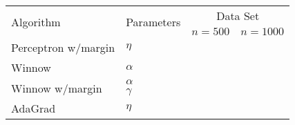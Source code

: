 
\usepackage{amsmath,amssymb,url,color,multirow,array}
\sloppy
\newcommand{\ignore}[1]{}

\oddsidemargin 0in
\evensidemargin 0in
\textwidth 6.5in
\topmargin -0.5in
\textheight 9.0in



\begin{center}
  \begin{table}[!hbp]
    \begin{tabular}{|p{4.3cm}<{\centering}|p{2.5cm}<{\centering}|p{4cm}<{\centering}|p{4cm}<{\centering}|}
      \hline
      \multirow{2}{*}{Algorithm} & \multirow{2}{*}{Parameters} & \multicolumn{2}{|c|}{Data Set} \\
      \cline{3-4}
 & & $n=500$& $n=1000$\\
 \hline
      Perceptron w/margin &          $\eta$          &                   &                                   \\ \hline
      Winnow               &     $\alpha$           &                     &                                   \\\hline %
      \multirow{2}{*}{Winnow w/margin}     & $\alpha$&                                     &                     \\
      \cline{2-4}
      & $\gamma$ &  & \\ \hline %
      AdaGrad             & $\eta$&                                      &                                   \\\hline %
    \end{tabular}
    \end{table}
  \end{center}
  
